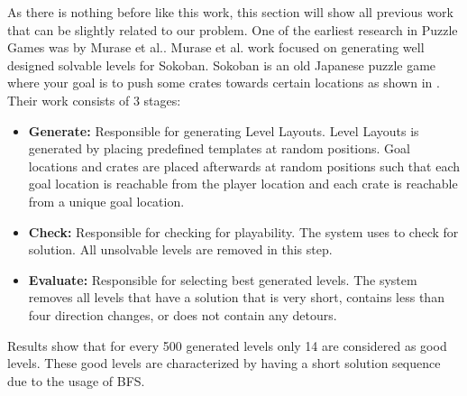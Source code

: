 As there is nothing before like this work, this section will show all previous work that can be slightly related to our problem. One of the earliest research in Puzzle Games was by Murase et al.\cite{sokobanLevelGenerationOld}. Murase et al. work focused on generating well designed solvable levels for Sokoban\cite{sokoban}. Sokoban is an old Japanese puzzle game where your goal is to push some crates towards certain locations as shown in . Their work consists of 3 stages:
\begin{itemize} \itemsep0pt \parskip0pt 
	\item \textbf{Generate:} Responsible for generating Level Layouts. Level Layouts is generated by placing predefined templates at random positions. Goal locations and crates are placed afterwards at random positions such that each goal location is reachable from the player location and each crate is reachable from a unique goal location.
	\item \textbf{Check:} Responsible for checking for playability. The system uses  to check for solution. All unsolvable levels are removed in this step.
	\item \textbf{Evaluate:} Responsible for selecting best generated levels. The system removes all levels that have a solution that is very short, contains less than four direction changes, or does not contain any detours.
\end{itemize}
Results show that for every 500 generated levels only 14 are considered as good levels. These good levels are characterized by having a short solution sequence due to the usage of BFS.\\\par

